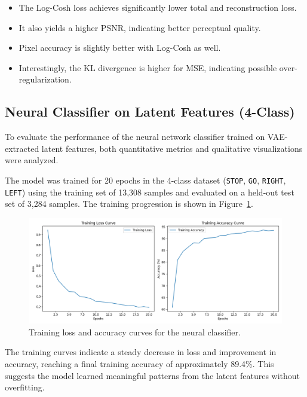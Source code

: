 \begin{itemize}
    \item The Log-Cosh loss achieves significantly lower total and reconstruction loss.
    \item It also yields a higher PSNR, indicating better perceptual quality.
    \item Pixel accuracy is slightly better with Log-Cosh as well.
    \item Interestingly, the KL divergence is higher for MSE, indicating possible over-regularization.
\end{itemize}






\subsection{Neural Classifier on Latent Features (4-Class)}

To evaluate the performance of the neural network classifier trained on VAE-extracted latent features, both quantitative metrics and qualitative visualizations were analyzed.

The model was trained for 20 epochs in the 4-class dataset (\texttt{STOP}, \texttt{GO}, \texttt{RIGHT}, \texttt{LEFT}) using the training set of 13,308 samples and evaluated on a held-out test set of 3,284 samples. The training progression is shown in Figure~\ref{fig:loss_accuracy_plot}.

\begin{figure}[h]
    \centering
    \includegraphics[width=\textwidth]{img/classifier/training_loss_accuracy_4_classes.png}
    \caption{Training loss and accuracy curves for the neural classifier.}
    \label{fig:loss_accuracy_plot}
\end{figure}

The training curves indicate a steady decrease in loss and improvement in accuracy, reaching a final training accuracy of approximately 89.4\%. This suggests the model learned meaningful patterns from the latent features without overfitting.

